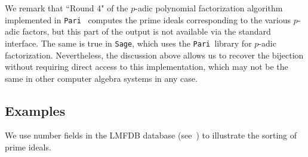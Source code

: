 \documentclass{article}
\def\Sage{{\tt Sage}}
\def\Pari{{\tt Pari}}
\def\Q{{\mathbb Q}}
\def\p{{\mathfrak p}}
\DeclareMathOperator{\disc}{disc}
\DeclareMathOperator{\ord}{ord}
\begin{document}
We remark that ``Round 4" of the $p$-adic polynomial factorization
algorithm implemented in \Pari\ \cite{Roblot} computes the prime
ideals corresponding to the various $p$-adic factors, but this part of
the output is not available via the standard interface.  The same is
true in \Sage, which uses the \Pari\ library for $p$-adic
factorization.  Nevertheless, the discussion above allows us to
recover the bijection without requiring direct access to this
implementation, which may not be the same in other computer algebra
systems in any case.

%
%
%

\subsection{Examples}
We use number fields in the LMFDB database (see~\cite{lmfdb}) to
illustrate the sorting of prime ideals.
\end{document}
